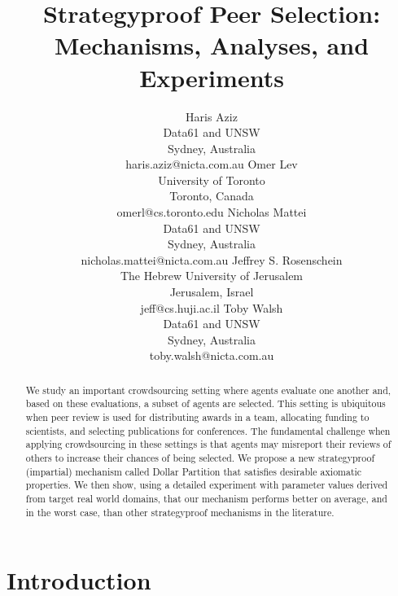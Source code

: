 \documentclass[letterpaper]{article}
\begin{document}
\title{Strategyproof Peer Selection: Mechanisms, Analyses, and Experiments}

\author{
Haris Aziz\\
Data61 and UNSW\\
Sydney, Australia\\
haris.aziz@nicta.com.au
\And
Omer Lev\\
University of Toronto\\
Toronto, Canada\\
omerl@cs.toronto.edu
\And
Nicholas Mattei\\
Data61 and UNSW\\
Sydney, Australia\\
nicholas.mattei@nicta.com.au
\AND
Jeffrey S. Rosenschein\\
The Hebrew University of Jerusalem\\
Jerusalem, Israel\\
jeff@cs.huji.ac.il
\And
Toby Walsh\\
Data61 and UNSW\\
Sydney, Australia\\
toby.walsh@nicta.com.au
}




\maketitle

\begin{abstract}
We study an important crowdsourcing setting where agents evaluate one another and, based on these evaluations, a subset of agents are selected. This setting is ubiquitous when peer review is used for distributing awards in a team, allocating funding to scientists, and selecting publications for conferences. The fundamental challenge when applying crowdsourcing in these settings is that agents may misreport their reviews of others to increase their chances of being selected. We propose a new strategyproof (impartial) mechanism called Dollar Partition that satisfies desirable axiomatic properties. We then show, using a detailed experiment with parameter values derived from target real world domains, that our mechanism performs better on average, and in the worst case, than other strategyproof mechanisms in the literature.
\end{abstract}

\section{Introduction}
\end{document}
